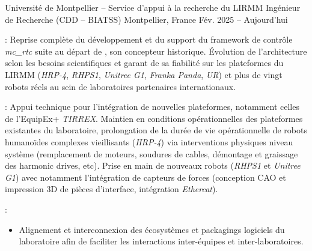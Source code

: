 
\begin{cventries}
  \cventry
  {Université de Montpellier -- Service d'appui à la recherche du LIRMM} %
  {Ingénieur de Recherche (CDD -- BIATSS)} %
  {Montpellier, France} %
  {Fév. 2025 -- Aujourd'hui} %
  {
    \begin{cvitems} %
    \item {} : Reprise complète du développement et du
      support du framework de contrôle \emph{mc\_rtc} suite au départ de , son concepteur historique. Évolution de l'architecture selon les besoins scientifiques et
      garant de sa fiabilité sur les plateformes du LIRMM (\emph{HRP-4}, \emph{RHPS1}, \emph{Unitree G1},
      \emph{Franka Panda}, \emph{UR}) et plus de vingt robots réels au sein de laboratoires partenaires internationaux.
    \item {} : Appui technique pour
      l'intégration de nouvelles plateformes, notamment celles de l'EquipEx+ \emph{TIRREX}. Maintien en
      conditions opérationnelles des plateformes existantes du laboratoire, prolongation de la durée de vie
      opérationnelle de robots humanoïdes complexes vieillisants (\emph{HRP-4}) via interventions physiques
      niveau système (remplacement de moteurs, soudures de cables, démontage et graissage des harmonic
      drives, etc). Prise en main de nouveaux robots (\emph{RHPS1} et \emph{Unitree G1}) avec notamment
      l'intégration de capteurs de forces (conception CAO et impression 3D de pièces d'interface, intégration
      \emph{Ethercat}).
    \item {} :
      \begin{itemize}
        \item Alignement et interconnexion des écosystèmes et packagings logiciels du laboratoire afin de
          faciliter les interactions inter-équipes et inter-laboratoires.

\end{itemize}
\end{cvitems}}
\end{cventries}
